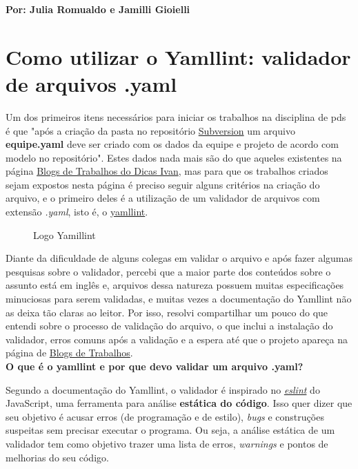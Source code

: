 \textbf{Por: Julia Romualdo e Jamilli Gioielli}

\section{Como utilizar o Yamllint: validador de arquivos .yaml}

Um dos primeiros itens necessários para iniciar os trabalhos na disciplina de \acs{pds} é  que "após a criação da pasta no repositório \href{https://dicas.ivanfm.com/programacao/scm/controle-de-versao/subversion.html}{Subversion} um arquivo \textbf{equipe.yaml} deve ser criado com os dados da equipe e projeto de acordo com modelo no repositório". Estes dados nada mais são do que aqueles existentes na página \href{https://dicas.ivanfm.com/aulas/blogs-de-trabalhos.html}{Blogs de Trabalhos do Dicas Ivan}, mas para que os trabalhos criados sejam expostos nesta página é preciso seguir alguns critérios na criação do arquivo, e o primeiro deles é a utilização de um validador de arquivos com extensão \textit{.yaml}, isto é, o \href{https://yamllint.readthedocs.io/en/stable/quickstart.html}{yamllint}.

\begin{figure}[htb]
\centering
\caption{\label{Yamillint} Logo Yamillint}

\end{figure}
\FloatBarrier

Diante da dificuldade de alguns colegas em validar o arquivo e após fazer algumas pesquisas sobre o validador, percebi que a maior parte dos conteúdos sobre o assunto está em inglês e, arquivos dessa natureza possuem muitas especificações minuciosas para serem validadas, e muitas vezes a documentação do \gls{Yamllint} não as deixa tão claras ao leitor. Por isso, resolvi compartilhar um pouco do que entendi sobre o processo de validação do arquivo, o que inclui a instalação do validador, erros comuns após a validação e a espera até que o projeto apareça na página de \href{https://dicas.ivanfm.com/aulas/blogs-de-trabalhos.html}{Blogs de Trabalhos}.\\

\textbf{O que é o yamllint e por que devo validar um arquivo .yaml?}

Segundo a documentação do \gls{Yamllint}, o validador é inspirado no \textit{\href{https://eslint.org/}{eslint}} do JavaScript, uma ferramenta para análise \textbf{estática do código}. Isso quer dizer que seu objetivo é acusar erros (de programação e de estilo), \textit{bugs} e construções suspeitas sem precisar executar o programa. Ou seja, a análise estática de um validador tem como objetivo trazer uma lista de erros, \textit{warnings} e pontos de melhorias do seu código. 

